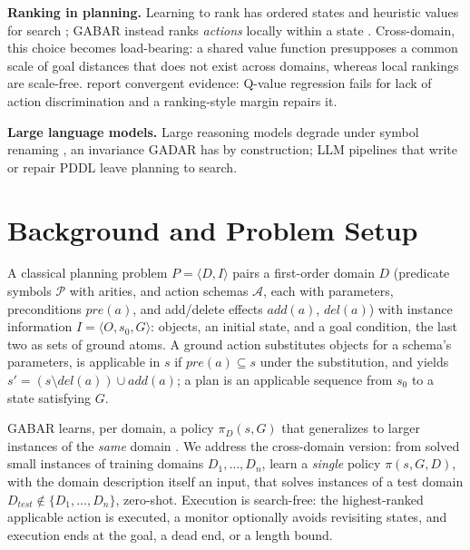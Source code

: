 \documentclass{article} %
\newcommand{\gadar}{GADAR}                 %
\begin{document}
\textbf{Ranking in planning.} Learning to rank has ordered states and
heuristic values for search \citep{ranking_old_2009, ranking_og,
chrestien_optimize, gbfs_v2}; GABAR instead ranks \emph{actions} locally
within a state \citep{gabar}. Cross-domain, this choice becomes
load-bearing: a shared value function presupposes a common scale of goal
distances that does not exist across domains, whereas local rankings are
scale-free. \citet{mueller_qvalues} report convergent evidence: Q-value
regression fails for lack of action discrimination and a ranking-style
margin repairs it.

\textbf{Large language models.} Large reasoning models degrade under symbol
renaming \citep{llm_baseline}, an invariance \gadar{} has by construction;
LLM pipelines that write or repair PDDL \citep{halo_orchestrator} leave
planning to search.

\section{Background and Problem Setup}

A classical planning problem $P = \langle D, I \rangle$ pairs a first-order
domain $D$ (predicate symbols $\mathcal{P}$ with arities, and action
schemas $\mathcal{A}$, each with parameters, preconditions $pre(a)$, and
add/delete effects $add(a)$, $del(a)$) with instance information
$I = \langle O, s_0, G \rangle$: objects, an initial state, and a goal
condition, the last two as sets of ground atoms. A ground action
substitutes objects for a schema's parameters, is applicable in $s$ if
$pre(a) \subseteq s$ under the substitution, and yields
$s' = (s \setminus del(a)) \cup add(a)$; a plan is an applicable sequence
from $s_0$ to a state satisfying $G$.

GABAR learns, per domain, a policy $\pi_D(s, G)$ that generalizes to larger
instances of the \emph{same} domain \citep{gabar}. We address the
cross-domain version: from solved small instances of training domains
$D_1, \dots, D_n$, learn a \emph{single} policy $\pi(s, G, D)$, with the
domain description itself an input, that solves instances of a test
domain $D_{\mathit{test}} \notin \{D_1, \dots, D_n\}$, zero-shot. Execution
is search-free: the highest-ranked applicable action is executed, a monitor optionally avoids revisiting states, and execution ends
at the goal, a dead end, or a length bound.
\end{document}
